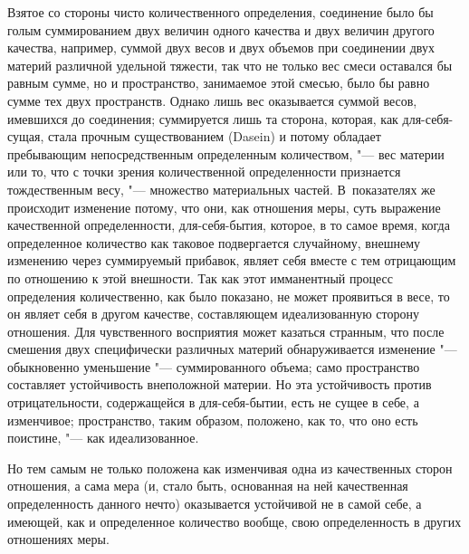 Взятое со стороны чисто количественного определения, соединение было бы
голым суммированием двух величин одного качества и двух величин другого
качества, например, суммой двух весов и двух объемов при соединении двух
материй различной удельной тяжести, так что не только вес смеси оставался
бы равным сумме, но и пространство, занимаемое этой смесью, было бы равно
сумме тех двух пространств. Однако лишь вес оказывается суммой весов,
имевшихся до соединения; суммируется лишь та сторона, которая, как
для-себя-сущая, стала прочным существованием (Dasein) и потому обладает
пребывающим непосредственным определенным количеством, "--- вес материи или
то, что с точки зрения количественной определенности признается
тождественным весу, "--- множество материальных частей. В~показателях же
происходит изменение потому, что они, как отношения меры, суть выражение
качественной определенности, для-себя-бытия, которое, в то самое время,
когда определенное количество как таковое подвергается случайному, внешнему
изменению через суммируемый прибавок, являет себя вместе с тем отрицающим
по отношению к этой внешности. Так как этот имманентный процесс определения
количественно, как было показано, не может проявиться в весе, то он являет
себя в другом качестве, составляющем идеализованную сторону отношения. Для
чувственного восприятия может казаться странным, что после смешения двух
специфически различных материй обнаруживается изменение "--- обыкновенно
уменьшение "--- суммированного объема; само пространство составляет
устойчивость внеположной материи. Но эта устойчивость против
отрицательности, содержащейся в для-себя-бытии, есть не сущее в себе, а
изменчивое; пространство, таким образом, положено, как то, что оно есть
поистине, "--- как идеализованное.

Но тем самым не только положена как изменчивая одна из качественных сторон
отношения, а сама мера (и, стало быть, основанная на ней качественная
определенность данного нечто) оказывается устойчивой не в самой себе, а
имеющей, как и определенное количество вообще, свою определенность в других
отношениях меры.

